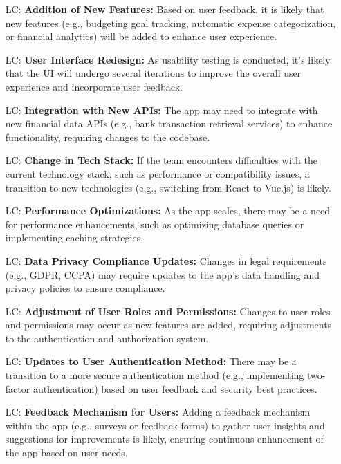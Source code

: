 \documentclass[12pt]{article}
\newcounter{lcnum} %
\begin{document}
\noindent \begin{itemize}
	\item[LC\refstepcounter{lcnum}\thelcnum\label{Addition of New Features}:] \textbf{Addition of New Features:} Based on user feedback, it is likely that new features (e.g., budgeting goal tracking, automatic expense categorization, or financial analytics) will be added to enhance user experience.
	\item[LC\refstepcounter{lcnum}\thelcnum\label{User Interface Redesign}:] \textbf{User Interface Redesign:} As usability testing is conducted, it's likely that the UI will undergo several iterations to improve the overall user experience and incorporate user feedback.
	\item[LC\refstepcounter{lcnum}\thelcnum\label{Integration with New APIs}:] \textbf{Integration with New APIs:} The app may need to integrate with new financial data APIs (e.g., bank transaction retrieval services) to enhance functionality, requiring changes to the codebase.
	\item[LC\refstepcounter{lcnum}\thelcnum\label{Change in Tech Stack}:] \textbf{Change in Tech Stack:} If the team encounters difficulties with the current technology stack, such as performance or compatibility issues, a transition to new technologies (e.g., switching from React to Vue.js) is likely.
	\item[LC\refstepcounter{lcnum}\thelcnum\label{Performance Optimizations}:] \textbf{Performance Optimizations:} As the app scales, there may be a need for performance enhancements, such as optimizing database queries or implementing caching strategies.
	\item[LC\refstepcounter{lcnum}\thelcnum\label{Data Privacy Compliance Updates}:] \textbf{Data Privacy Compliance Updates:} Changes in legal requirements (e.g., GDPR, CCPA) may require updates to the app's data handling and privacy policies to ensure compliance.
	\item[LC\refstepcounter{lcnum}\thelcnum\label{Adjustment of User Roles and Permissions}:] \textbf{Adjustment of User Roles and Permissions:} Changes to user roles and permissions may occur as new features are added, requiring adjustments to the authentication and authorization system.
	\item[LC\refstepcounter{lcnum}\thelcnum\label{Updates to User Authentication Method}:] \textbf{Updates to User Authentication Method:} There may be a transition to a more secure authentication method (e.g., implementing two-factor authentication) based on user feedback and security best practices.
	\item[LC\refstepcounter{lcnum}\thelcnum\label{Feedback Mechanism for Users}:] \textbf{Feedback Mechanism for Users:} Adding a feedback mechanism within the app (e.g., surveys or feedback forms) to gather user insights and suggestions for improvements is likely, ensuring continuous enhancement of the app based on user needs.
\end{itemize}
\end{document}
